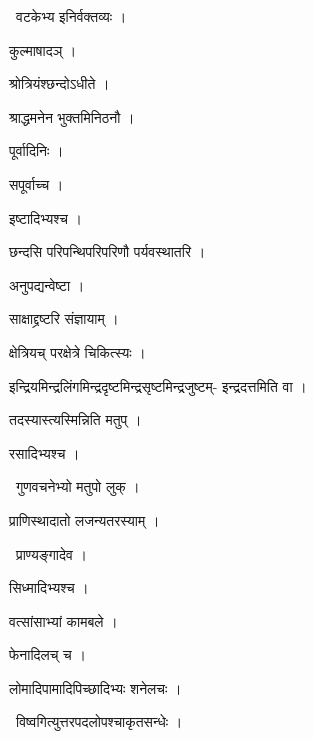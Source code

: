 \documentclass[10pt, openany, oneside]{book}
\begin{document}
\par\noindent\hspace{1.5em}{\vps वा॰}~{\qt वटकेभ्य इनिर्वक्तव्यः ।}

\noindent कुल्माषादञ् ।

\noindent श्रोत्रियंश्छन्दोऽधीते ।

\noindent श्राद्धमनेन भुक्तमिनिठनौ ।

\noindent पूर्वादिनिः ।

\noindent सपूर्वाच्च ।

\noindent इष्टादिभ्यश्च ।

\noindent छन्दसि परिपन्थिपरिपरिणौ पर्यवस्थातरि ।

\noindent अनुपद्यन्वेष्टा ।

\noindent साक्षाद्द्रष्टरि संज्ञायाम् ।

\noindent क्षेत्रियच् परक्षेत्रे चिकित्स्यः ।

\noindent इन्द्रियमिन्द्रलिंगमिन्द्रदृष्टमिन्द्रसृष्टमिन्द्रजुष्टम्- इन्द्रदत्तमिति वा ।

\noindent तदस्यास्त्यस्मिन्निति मतुप् ।

\noindent रसादिभ्यश्च ।

\par\noindent\hspace{1.5em}{\vps वा॰}~{\qt गुणवचनेभ्यो मतुपो लुक् ।}

\noindent प्राणिस्थादातो लजन्यतरस्याम् ।

\par\noindent\hspace{1.5em}{\vps वा॰}~{\qt प्राण्यङ्गादेव ।}

\noindent सिध्मादिभ्यश्च ।

\noindent वत्सांसाभ्यां कामबले ।

\noindent फेनादिलच् च ।

\noindent लोमादिपामादिपिच्छादिभ्यः शनेलचः ।

\par\noindent\hspace{1.5em}{\vps वा॰}~{\qt विष्वगित्युत्तरपदलोपश्चाकृतसन्धेः ।}
\end{document}
